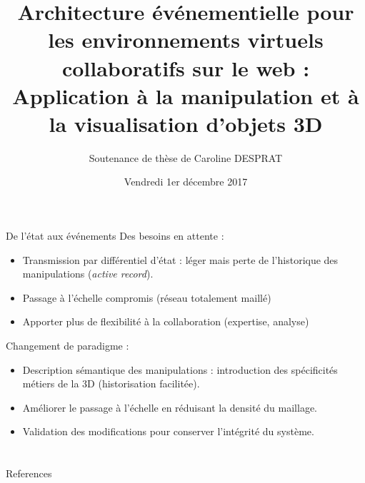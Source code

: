 \documentclass[aspectratio=169,10pt, compress,usenames,dvipsnames]{beamer}
\title{Architecture événementielle pour les environnements virtuels 
collaboratifs sur le web : Application à la manipulation et à la visualisation 
d'objets 3D}
\date{Vendredi 1er décembre 2017}
\author{Soutenance de thèse de Caroline DESPRAT}
\institute{IRIT - Université de Toulouse}
\begin{document}
	\maketitle






\begin{frame}{De l'état aux événements}
	Des besoins en attente :
		\begin{itemize}
		\item Transmission par différentiel d'état : léger mais perte de l'historique des 
		manipulations (\textit{active record}).
		\item Passage à l'échelle compromis (réseau totalement maillé)
		\item Apporter plus de flexibilité à la collaboration (expertise, analyse)
	\end{itemize}
	
	Changement de paradigme : 
	\begin{itemize}
		\item Description sémantique des manipulations : introduction des 
		spécificités 
		métiers de la 3D (historisation facilitée).
		\item Améliorer le passage à l'échelle en réduisant la densité du maillage.
		\item Validation des modifications pour conserver l'intégrité du système.
	
	\end{itemize}

\end{frame}







\section{}
\begin{frame}{References}
\tiny



\end{frame}
\end{document}
